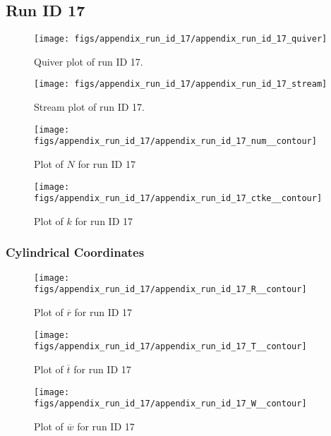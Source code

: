 \subsection{Run ID 17}
\begin{figure}[H]
\centering
\texttt{[image: figs/appendix\_run\_id\_17/appendix\_run\_id\_17\_quiver]}
\caption{Quiver plot of run ID 17.}
\label{fig:appendix_run_id_17_quiver}
\end{figure}


\begin{figure}[H]
\centering
\texttt{[image: figs/appendix\_run\_id\_17/appendix\_run\_id\_17\_stream]}
\caption{Stream plot of run ID 17.}
\label{fig:appendix_run_id_17_stream}
\end{figure}


\begin{figure}[H]
\centering
\texttt{[image: figs/appendix\_run\_id\_17/appendix\_run\_id\_17\_num\_\_contour]}
\caption{Plot of $N$ for run ID 17}
\label{fig:appendix_run_id_17_num__contour}
\end{figure}


\begin{figure}[H]
\centering
\texttt{[image: figs/appendix\_run\_id\_17/appendix\_run\_id\_17\_ctke\_\_contour]}
\caption{Plot of $k$ for run ID 17}
\label{fig:appendix_run_id_17_ctke__contour}
\end{figure}


\subsubsection{Cylindrical Coordinates}
\begin{figure}[H]
\centering
\texttt{[image: figs/appendix\_run\_id\_17/appendix\_run\_id\_17\_R\_\_contour]}
\caption{Plot of $\overline{r}$ for run ID 17}
\label{fig:appendix_run_id_17_R__contour}
\end{figure}


\begin{figure}[H]
\centering
\texttt{[image: figs/appendix\_run\_id\_17/appendix\_run\_id\_17\_T\_\_contour]}
\caption{Plot of $\overline{t}$ for run ID 17}
\label{fig:appendix_run_id_17_T__contour}
\end{figure}


\begin{figure}[H]
\centering
\texttt{[image: figs/appendix\_run\_id\_17/appendix\_run\_id\_17\_W\_\_contour]}
\caption{Plot of $\overline{w}$ for run ID 17}
\label{fig:appendix_run_id_17_W__contour}
\end{figure}


